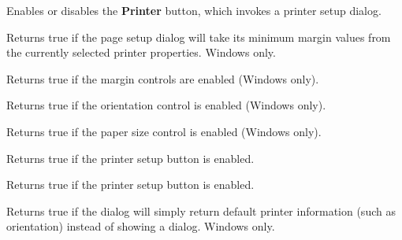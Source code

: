 
Enables or disables the {\bf Printer} button, which invokes a printer setup dialog.

\label{wxpagesetupdialogdatagetdefaultminmargins}


Returns true if the page setup dialog will take its minimum margin values from the currently
selected printer properties. Windows only.

\label{wxpagesetupdialogdatagetenablemargins}


Returns true if the margin controls are enabled (Windows only).

\label{wxpagesetupdialogdatagetenableorientation}


Returns true if the orientation control is enabled (Windows only).

\label{wxpagesetupdialogdatagetenablepaper}


Returns true if the paper size control is enabled (Windows only).

\label{wxpagesetupdialogdatagetenableprinter}


Returns true if the printer setup button is enabled.

\label{wxpagesetupdialogdatagetenablehelp}


Returns true if the printer setup button is enabled.

\label{wxpagesetupdialogdatagetdefaultinfo}


Returns true if the dialog will simply return default printer information (such as orientation)
instead of showing a dialog. Windows only.

